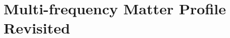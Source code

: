 











\section{\label{chap:matter-subsec:multi-frequency-revisited}Multi-frequency Matter Profile Revisited}


